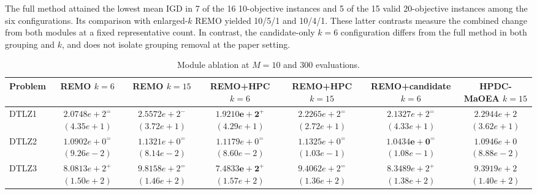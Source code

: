 \documentclass[final,5p,times,twocolumn]{elsarticle}
\begin{document}
The full method attained the lowest mean IGD in 7 of the 16
10-objective instances and 5 of the 15 valid 20-objective instances among
the six configurations. Its comparison with enlarged-$k$ REMO yielded
10/5/1 and 10/4/1. These latter contrasts measure the combined change
from both modules at a fixed representative count. In contrast, the
candidate-only $k=6$ configuration differs from the full method in both
grouping and $k$, and does not isolate grouping removal at the paper
setting.

\begin{table}[t]
\centering
\caption{Module ablation at $M=10$ and 300 evaluations.}
\label{tab:exp:abl10}
\scriptsize
\setlength{\tabcolsep}{4pt}
\renewcommand{\arraystretch}{1.12}
\begin{tabular}{lcccccc}
\toprule
Problem & \shortstack{REMO\\$k=6$} & \shortstack{REMO\\$k=15$} & \shortstack{REMO+HPC\\$k=6$} & \shortstack{REMO+HPC\\$k=15$} & \shortstack{REMO+candidate\\$k=6$} & \shortstack{HPDC-MaOEA\\$k=15$} \\
\midrule
DTLZ1 & \shortstack{$2.0748e+2^{=}$\\$(4.35e+1)$} & \shortstack{$2.5572e+2^{-}$\\$(3.72e+1)$} & \shortstack{$\mathbf{1.9210e+2}^{+}$\\$(4.29e+1)$} & \shortstack{$2.2265e+2^{=}$\\$(2.72e+1)$} & \shortstack{$2.1327e+2^{=}$\\$(4.33e+1)$} & \shortstack{$2.2944e+2$\\$(3.62e+1)$} \\
DTLZ2 & \shortstack{$1.0902e+0^{=}$\\$(9.26e-2)$} & \shortstack{$1.1321e+0^{=}$\\$(8.14e-2)$} & \shortstack{$1.1179e+0^{=}$\\$(8.60e-2)$} & \shortstack{$1.1325e+0^{=}$\\$(1.03e-1)$} & \shortstack{$\mathbf{1.0434e+0}^{=}$\\$(1.08e-1)$} & \shortstack{$1.0946e+0$\\$(8.88e-2)$} \\
DTLZ3 & \shortstack{$8.0813e+2^{+}$\\$(1.50e+2)$} & \shortstack{$9.8158e+2^{=}$\\$(1.46e+2)$} & \shortstack{$\mathbf{7.4833e+2}^{+}$\\$(1.57e+2)$} & \shortstack{$9.4062e+2^{=}$\\$(1.36e+2)$} & \shortstack{$8.3489e+2^{+}$\\$(1.38e+2)$} & \shortstack{$9.3919e+2$\\$(1.40e+2)$} \\

\end{tabular}
\end{table}
\end{document}
